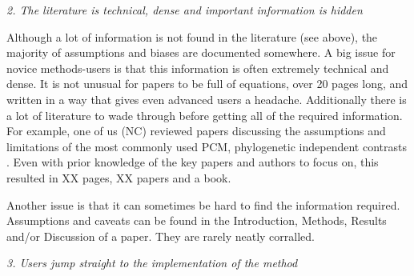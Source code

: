 \documentclass[a4paper,12pt]{article}
\renewcommand{\subsection}[1]{
  \bigskip
  \begin{center}
  \begin{large}
  \normalfont\itshape #1
  \end{large}
  \end{center}
}
\begin{document}
\subsection{2. The literature is technical, dense and important information is hidden}

Although a lot of information is not found in the literature (see above), the majority of assumptions and biases are documented somewhere. 
A big issue for novice methods-users is that this information is often extremely technical and dense. 
It is not unusual for papers to be full of equations, over 20 pages long, and written in a way that gives even advanced users a headache. 
Additionally there is a lot of literature to wade through before getting all of the required information. 
For example, one of us (NC) reviewed papers discussing the assumptions and limitations of the most commonly used PCM, phylogenetic independent contrasts \citep{felsenstein1985phylogenies}. 
Even with prior knowledge of the key papers and authors to focus on, this resulted in XX pages, XX papers and a book.

Another issue is that it can sometimes be hard to find the information required. Assumptions and caveats can be found in the Introduction, Methods, Results and/or Discussion of a paper. They are rarely neatly corralled. 





\subsection{3. Users jump straight to the implementation of the method}

\end{document}
